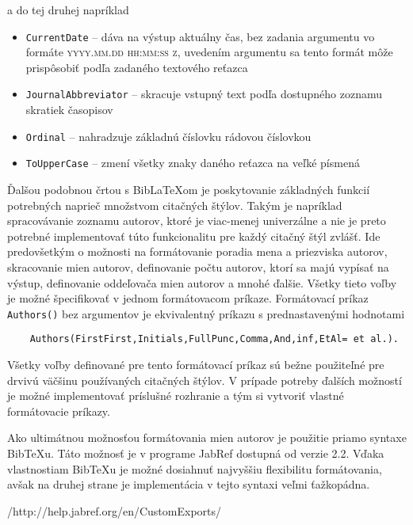 \documentclass{fithesis3}
\begin{document}
	\noindent a do tej druhej napríklad
	
	\begin{itemize}
	\item \texttt{CurrentDate} -- dáva na výstup aktuálny čas, bez zadania argumentu vo formáte \textsc{yyyy.mm.dd hh:mm:ss z}, uvedením argumentu sa tento formát môže prispôsobiť podľa zadaného textového reťazca
	\item \texttt{JournalAbbreviator} -- skracuje vstupný text podľa dostupného zoznamu skratiek časopisov
	\item \texttt{Ordinal} -- nahradzuje základnú číslovku rádovou číslovkou
	\item \texttt{ToUpperCase} -- zmení všetky znaky daného reťazca na veľké písmená
	\end{itemize}
	
	\noindent Ďalšou podobnou črtou s BibLaTeXom je poskytovanie základných funkcií potrebných naprieč množstvom citačných štýlov. Takým je napríklad spracovávanie zoznamu autorov, ktoré je viac-menej univerzálne a nie je preto potrebné implementovať túto funkcionalitu pre každý citačný štýl zvlášť. Ide predovšetkým o možnosti na formátovanie poradia mena a priezviska autorov, skracovanie mien autorov, definovanie počtu autorov, ktorí sa majú vypísať na výstup, definovanie oddeľovača mien autorov a mnohé ďalšie. Všetky tieto voľby je možné špecifikovať v jednom formátovacom príkaze. Formátovací príkaz \texttt{Authors()} bez argumentov je ekvivalentný príkazu s prednastavenými hodnotami
	
	\begin{verbatim}
	Authors(FirstFirst,Initials,FullPunc,Comma,And,inf,EtAl= et al.).
	\end{verbatim}
	
	\noindent Všetky voľby definované pre tento formátovací príkaz sú bežne použiteľné pre drvivú väčšinu používaných citačných štýlov. V prípade potreby ďalších možností je možné implementovať príslušné rozhranie a tým si vytvoriť vlastné formátovacie príkazy.
	
	\noindent Ako ultimátnou možnosťou formátovania mien autorov je použitie priamo syntaxe BibTeXu. Táto možnosť je v programe JabRef dostupná od verzie 2.2. Vďaka vlastnostiam BibTeXu je možné dosiahnuť najvyššiu flexibilitu formátovania, avšak na druhej strane je implementácia v tejto syntaxi veľmi ťažkopádna.
	
	/http://help.jabref.org/en/CustomExports/
	
\end{document}
